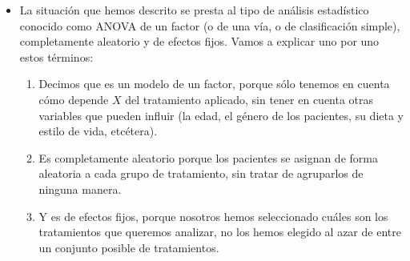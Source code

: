 \begin{itemize}
    \item La situación que hemos descrito se presta al tipo de análisis estadístico conocido como {\sf ANOVA de un factor (o de una vía, o de clasificación simple), completamente aleatorio y de efectos fijos.} Vamos a explicar uno por uno estos términos:
    \begin{enumerate}
        \item Decimos que es un modelo de un factor, porque sólo tenemos en cuenta cómo depende $X$ del tratamiento aplicado, sin tener en cuenta otras variables que pueden influir (la edad, el género de los pacientes, su dieta y estilo de vida, etcétera).
            \item Es completamente aleatorio porque los pacientes se asignan de forma aleatoria a cada grupo de tratamiento, sin tratar de agruparlos de ninguna manera.
            \item Y es de efectos fijos, porque nosotros hemos seleccionado cuáles son los tratamientos que queremos analizar, no los hemos elegido al azar de entre un conjunto posible de tratamientos.
    \end{enumerate}


\end{itemize}
